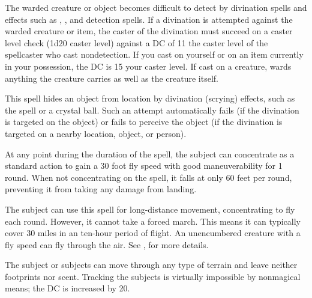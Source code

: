 \spelldur{\durext \dismissable}
\spelleffect The warded creature or object becomes difficult to detect by divination spells and effects such as , , and detection spells. If a divination is attempted against the warded creature or item, the caster of the divination must succeed on a caster level check (1d20 \add caster level) against a DC of 11 \add the caster level of the spellcaster who cast nondetection. If you cast  on yourself or on an item currently in your possession, the DC is 15 \add your caster level.
\spellnotes If cast on a creature,  wards anything the creature carries as well as the creature itself.

\spelldur{\durext \dismissable}
\spelleffect This spell hides an object from location by divination (scrying) effects, such as the  spell or a crystal ball. Such an attempt automatically fails (if the divination is targeted on the object) or fails to perceive the object (if the divination is targeted on a nearby location, object, or person).

\spelldur{\durext}
\spelleffect At any point during the duration of the spell, the subject can concentrate as a standard action to gain a 30 foot fly speed with good maneuverability for 1 round. When not concentrating on the spell, it falls at only 60 feet per round, preventing it from taking any damage from landing.

The subject can use this spell for long-distance movement, concentrating to fly each round. However, it cannot take a forced march. This means it can typically cover 30 miles in an ten-hour period of flight.
\spellnotes An unencumbered creature with a fly speed can fly through the air. See , for more details.

\spelldur{\durext \dismissable}
\spelleffect The subject or subjects can move through any type of terrain and leave neither footprints nor scent. Tracking the subjects is virtually impossible by nonmagical means; the DC is increased by 20.

